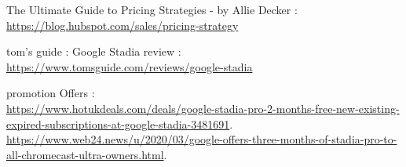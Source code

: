 \documentclass[a4paper,12pt]{article}
\newcommand{\link}[1]{{\color{blue}\href{#1}{#1}}}
\begin{document}
\begin{thebibliography}{9}
The Ultimate Guide to Pricing Strategies - by Allie Decker : \\ \link{https://blog.hubspot.com/sales/pricing-strategy}

tom's guide : Google Stadia review : \\ \link{https://www.tomsguide.com/reviews/google-stadia}

promotion Offers : \\ \link{https://www.hotukdeals.com/deals/google-stadia-pro-2-months-free-new-existing-expired-subscriptions-at-google-stadia-3481691}.
 \\ \link{https://www.web24.news/u/2020/03/google-offers-three-months-of-stadia-pro-to-all-chromecast-ultra-owners.html}.

\end{thebibliography}
\end{document}
